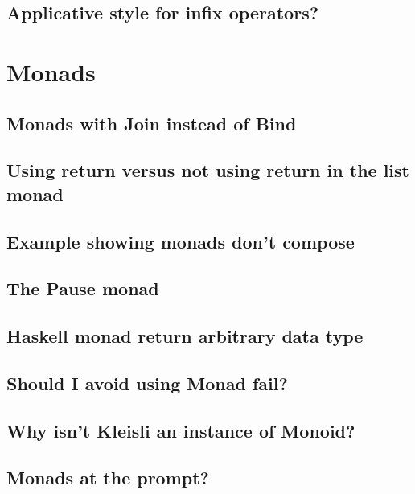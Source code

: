\documentclass{book}%
\begin{document}
\section{Applicative style for infix operators?}



\chapter{Monads}

\section{Monads with Join instead of Bind}


\section{Using return versus not using return in the list monad}


\section{Example showing monads don't compose}


\section{The Pause monad}


\section{Haskell monad return arbitrary data type}


\section{Should I avoid using Monad fail?}


\section{Why isn't Kleisli an instance of Monoid?}


\section{Monads at the prompt?}

\end{document}

